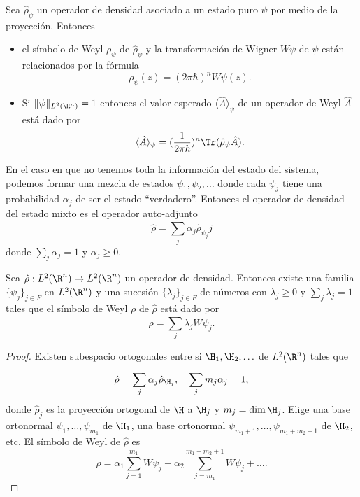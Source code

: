   \begin{proposition}
    Sea $\hat{\rho}_\psi$ un operador de densidad asociado a
    un estado puro $\psi$ por medio de la proyección.
    Entonces
    \begin{itemize}
      \item el símbolo de Weyl $\rho_\psi$ de
        $\hat{\rho}_\psi$ y la transformación de Wigner
        $W\psi$ de $\psi$ están relacionados por la fórmula
        \begin{equation}
          \rho_\psi(z)
          = (2\pi\hbar)^{n} W\psi(z).
        \end{equation}
      \item Si $\|\psi\|_{L^2(\R^{n})} = 1$ entonces el
        valor esperado $\langle \hat{A} \rangle_\psi$ de un
        operador de Weyl $\hat{A}$ está dado por
        \[
          \langle \hat{A} \rangle_\psi
          = (\frac{1}{2\pi\hbar})^{n} \Tr(\hat{\rho}_\psi
          \hat{A}).
        \] 
    \end{itemize}
  \end{proposition}

  En el caso en que no tenemos toda la información del
  estado del sistema, podemos formar una mezcla de estados
  $\psi_1,\psi_2,\ldots$ donde cada $\psi_j$ tiene una
  probabilidad $\alpha_j$ de ser el estado ``verdadero''.
  Entonces el operador de densidad del estado mixto es el
  operador auto-adjunto
  \[
    \hat{\rho}
    = \sum_{j}^{} \alpha_j \hat{\rho}_{\psi_j}j
  \] 
  donde $\sum_{j}^{} \alpha_j = 1$ y $\alpha_j \geq 0$.

  \begin{proposition}
    Sea $\hat{\rho} : L^2(\R^{n}) \to L^2(\R^{n})$ un
    operador de densidad. Entonces existe una familia
    $\{\psi_j\}_{j \in F}$ en $L^2(\R^{n})$ y una sucesión
    $\{\lambda_j\}_{j \in F}$ de números con $\lambda_j \geq
    0$ y $\sum_{j}^{} \lambda_j = 1$ tales que el símbolo de
    Weyl $\rho$ de $\hat{\rho}$ está dado por
    \[
      \rho 
      = \sum_{j}^{} \lambda_j W\psi_j.
    \] 
  \end{proposition}
  \begin{proof}
    Existen subespacio ortogonales entre si $\H_1,
    \H_2,\ldots$ de $L^2(\R^{n})$ tales que
    \[
      \hat{\rho}
      = \sum_{j}^{} \alpha_j \hat{\rho}_{\H_j},
      \quad 
      \sum_{j}^{} m_j \alpha_j = 1,
    \] 
    donde $\hat{\rho}_j$ es la proyección ortogonal de $\H$ 
    a $\H_j$ y $m_j = \dim \H_j$. Elige una base ortonormal
    $\psi_1,\ldots,\psi_{m_1}$ de $\H_1$, una base
    ortonormal $\psi_{m_1+1},\ldots,\psi_{m_1+m_2+1}$ de
    $\H_2$, etc. El símbolo de Weyl de $\hat{\rho}$ es
    \[
      \rho
      = \alpha_1 \sum_{j=1}^{m_1} W\psi_j
      + \alpha_2 \sum_{j=m_1}^{m_1+m_2+1} W\psi_j + \ldots.
    \] 
  \end{proof}

